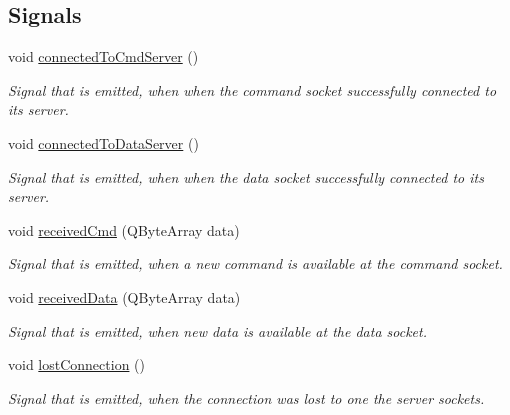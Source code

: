 \subsection*{Signals}
\begin{DoxyCompactItemize}
\item 
void \hyperlink{class_network_1_1_client_socket_afd964a562ce748dd3669150ee1918845}{connected\+To\+Cmd\+Server} ()
\begin{DoxyCompactList}\small\item\em Signal that is emitted, when when the command socket successfully connected to its server. \end{DoxyCompactList}\item 
void \hyperlink{class_network_1_1_client_socket_a90e3389d37d57852419b188a3b9c5aec}{connected\+To\+Data\+Server} ()
\begin{DoxyCompactList}\small\item\em Signal that is emitted, when when the data socket successfully connected to its server. \end{DoxyCompactList}\item 
void \hyperlink{class_network_1_1_client_socket_af0549e856cdcbc0078253152d7950184}{received\+Cmd} (Q\+Byte\+Array data)
\begin{DoxyCompactList}\small\item\em Signal that is emitted, when a new command is available at the command socket. \end{DoxyCompactList}\item 
void \hyperlink{class_network_1_1_client_socket_aa724115c563c37501d40948d69449bad}{received\+Data} (Q\+Byte\+Array data)
\begin{DoxyCompactList}\small\item\em Signal that is emitted, when new data is available at the data socket. \end{DoxyCompactList}\item 
void \hyperlink{class_network_1_1_client_socket_af70f63057d561c78c12d0b0f36408eec}{lost\+Connection} ()
\begin{DoxyCompactList}\small\item\em Signal that is emitted, when the connection was lost to one the server sockets. \end{DoxyCompactList}\end{DoxyCompactItemize}
